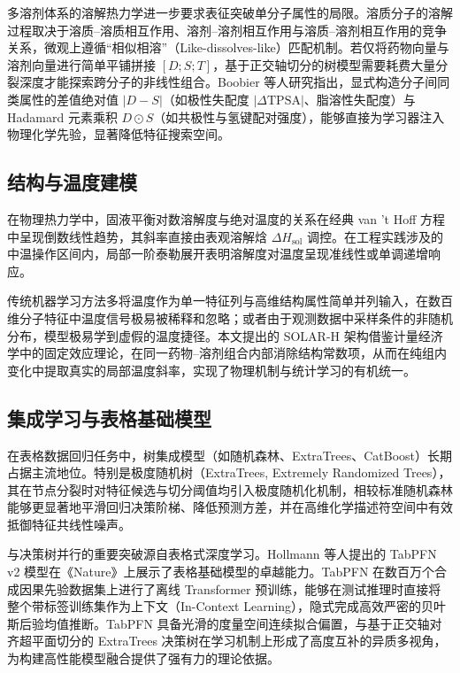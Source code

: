 多溶剂体系的溶解热力学进一步要求表征突破单分子属性的局限。溶质分子的溶解过程取决于溶质--溶质相互作用、溶剂--溶剂相互作用与溶质--溶剂相互作用的竞争关系，微观上遵循“相似相溶”（Like-dissolves-like）匹配机制。若仅将药物向量与溶剂向量进行简单平铺拼接 $[D; S; T]$，基于正交轴切分的树模型需要耗费大量分裂深度才能探索跨分子的非线性组合。Boobier 等人研究指出，显式构造分子间同类属性的差值绝对值 $|D-S|$（如极性失配度 $|\Delta\mathrm{TPSA}|$、脂溶性失配度）与 Hadamard 元素乘积 $D\odot S$（如共极性与氢键配对强度），能够直接为学习器注入物理化学先验，显著降低特征搜索空间\cite{boobier2020}。

\subsection{结构与温度建模}

在物理热力学中，固液平衡对数溶解度与绝对温度的关系在经典 van 't Hoff 方程中呈现倒数线性趋势，其斜率直接由表观溶解焓 $\Delta H_{\mathrm{sol}}$ 调控。在工程实践涉及的中温操作区间内，局部一阶泰勒展开表明溶解度对温度呈现准线性或单调递增响应。

传统机器学习方法多将温度作为单一特征列与高维结构属性简单并列输入，在数百维分子特征中温度信号极易被稀释和忽略；或者由于观测数据中采样条件的非随机分布，模型极易学到虚假的温度捷径。本文提出的 SOLAR-H 架构借鉴计量经济学中的固定效应理论，在同一药物--溶剂组合内部消除结构常数项，从而在纯组内变化中提取真实的局部温度斜率，实现了物理机制与统计学习的有机统一。

\subsection{集成学习与表格基础模型}

在表格数据回归任务中，树集成模型（如随机森林、ExtraTrees、CatBoost\cite{catboost2018}）长期占据主流地位。特别是极度随机树（ExtraTrees, Extremely Randomized Trees\cite{extratrees2006}），其在节点分裂时对特征候选与切分阈值均引入极度随机化机制，相较标准随机森林能够更显著地平滑回归决策阶梯、降低预测方差，并在高维化学描述符空间中有效抵御特征共线性噪声。

与决策树并行的重要突破源自表格式深度学习。Hollmann 等人提出的 TabPFN v2 模型在《Nature》上展示了表格基础模型的卓越能力\cite{tabpfn2025}。TabPFN 在数百万个合成因果先验数据集上进行了离线 Transformer 预训练，能够在测试推理时直接将整个带标签训练集作为上下文（In-Context Learning），隐式完成高效严密的贝叶斯后验均值推断。TabPFN 具备光滑的度量空间连续拟合偏置，与基于正交轴对齐超平面切分的 ExtraTrees 决策树在学习机制上形成了高度互补的异质多视角，为构建高性能模型融合提供了强有力的理论依据。

